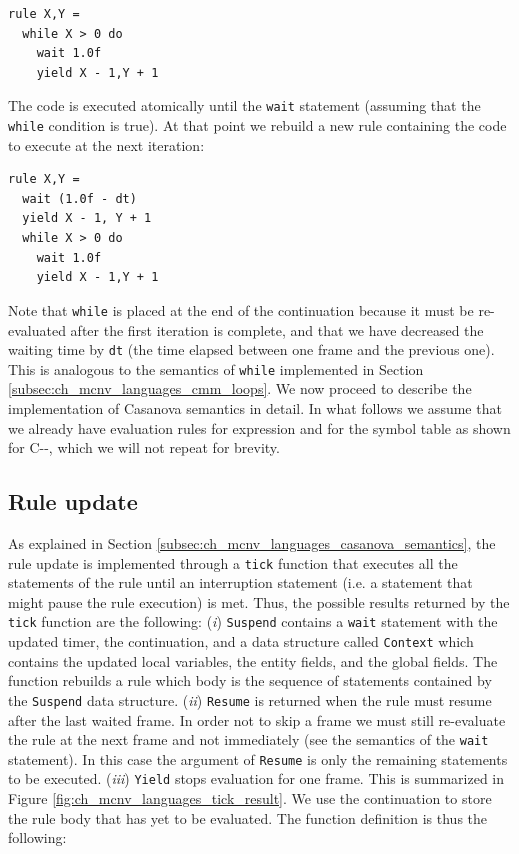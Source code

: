 \begin{lstlisting}
rule X,Y =
  while X > 0 do
    wait 1.0f
    yield X - 1,Y + 1
\end{lstlisting}

\noindent
The code is executed atomically until the \texttt{wait} statement (assuming that the \texttt{while} condition is true). At that point we rebuild a new rule containing the code to execute at the next iteration:

\begin{lstlisting}
rule X,Y =
  wait (1.0f - dt)
  yield X - 1, Y + 1
  while X > 0 do
    wait 1.0f
    yield X - 1,Y + 1
\end{lstlisting}
Note that \texttt{while} is placed at the end of the continuation because it must be re-evaluated after the first iteration is complete, and that we have decreased the waiting time by \texttt{dt} (the time elapsed between one frame and the previous one). This is analogous to the semantics of \texttt{while} implemented in Section \ref{subsec:ch_mcnv_languages_cmm_loops}. We now proceed to describe the implementation of Casanova semantics in detail. In what follows we assume that we already have evaluation rules for expression and for the symbol table as shown for C-{}-, which we will not repeat for brevity.

\subsection{Rule update}
\label{subsec:ch_mcnv_languages_rule_update}
As explained in Section \ref{subsec:ch_mcnv_languages_casanova_semantics}, the rule update is implemented through a \texttt{tick} function that executes all the statements of the rule until an interruption statement (i.e. a statement that might pause the rule execution) is met. Thus, the possible results returned by the \texttt{tick} function are the following: (\textit{i}) \texttt{Suspend} contains a \texttt{wait} statement with the updated timer, the continuation, and a data structure called \texttt{Context} which contains the updated local variables, the entity fields, and the global fields. The function rebuilds a rule which body is the sequence of statements contained by the \texttt{Suspend} data structure. (\textit{ii}) \texttt{Resume} is returned when the rule must resume after the last waited frame. In order not to skip a frame we must still re-evaluate the rule at the next frame and not immediately (see the semantics of the \texttt{wait} statement). In this case the argument of \texttt{Resume} is only the remaining statements to be executed. (\textit{iii}) \texttt{Yield} stops evaluation for one frame. This is summarized in Figure \ref{fig:ch_mcnv_languages_tick_result}. We use the continuation to store the rule body that has yet to be evaluated. The function definition is thus the following:

